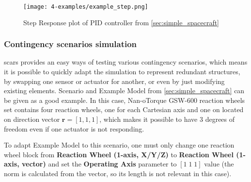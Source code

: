         \begin{figure}[H]
            \centering
            \texttt{[image: 4-examples/example\_step.png]}
            \caption{Step Response plot of PID controller from \autoref{sec:simple_spacecraft}}
            \label{fig:example_step}
        \end{figure}




        

    \subsubsection{Contingency scenarios simulation}
        \ac{scars} provides an easy ways of testing various contingency scenarios, which means it is possible to quickly adapt the simulation to represent redundant structures, by swapping one sensor or actuator for another, or even by just modifying existing elements. Scenario and Example Model from \autoref{sec:simple_spacecraft} can be given as a good example. In this case,  Nan-oTorque GSW-600 reaction wheels set contains four reaction wheels, one for each Cartesian axis and one on located on direction vector $\textbf{r} = [1, 1, 1]$, which makes it possible to have 3 degrees of freedom even if one actuator is not responding.

        To adapt Example Model to this scenario, one must only change one reaction wheel block from \textbf{Reaction Wheel (1-axis, X/Y/Z)} to \textbf{Reaction Wheel (1-axis, vector)} and set the \textbf{Operating Axis} parameter to $[1\; 1\; 1]$ value (the norm is calculated from the vector, so its length is not relevant in this case).

        
